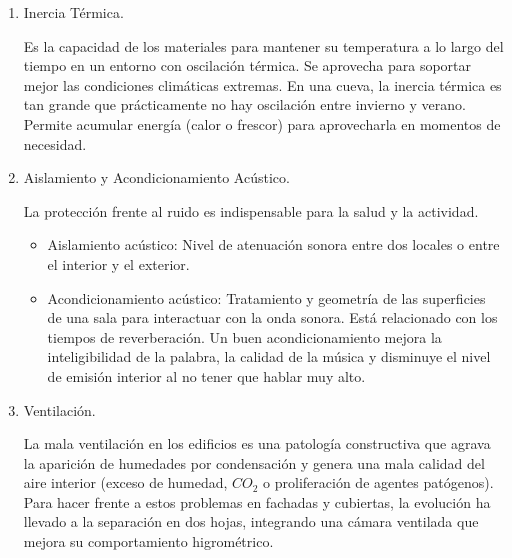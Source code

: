 \begin{enumerate}
Este mismo fenómeno se puede dar en la envolvente de los edificios el vapor de agua penetra a través de los cerramientos y tiende a ocupar el mayor volumen posible. Si el gradiente de temperatura alcanza el punto de rocío, se producirá la condensación.

La disposición de barrera de vapor supone un medio de evitar las condensaciones intersiciales situándolas siempre en la cara caliente del aislamiento térmico, evitando que el vapor penetre y se condense en el interior.

Los puentes térmicos son discontinuidades en el aislamiento (pérdidas de energía) susceptibles de generar condensaciones, conllevando al deterioro de los materiales.

    \item Inercia Térmica.
    
Es la capacidad de los materiales para mantener su temperatura a lo largo del tiempo en un entorno con oscilación térmica. Se aprovecha para soportar mejor las condiciones climáticas extremas. En una cueva, la inercia térmica es tan grande que prácticamente no hay oscilación entre invierno y verano. Permite acumular energía (calor o frescor) para aprovecharla en momentos de necesidad.

    \item Aislamiento y Acondicionamiento Acústico.
    
La protección frente al ruido es indispensable para la salud y la actividad.

\begin{itemize}
    \item Aislamiento acústico: Nivel de atenuación sonora entre dos locales o entre el interior y el exterior.
    \item Acondicionamiento acústico: Tratamiento y geometría de las superficies de una sala para interactuar con la onda sonora. Está relacionado con los tiempos de reverberación. Un buen acondicionamiento mejora la inteligibilidad de la palabra, la calidad de la música y disminuye el nivel de emisión interior al no tener que hablar muy alto.
\end{itemize}

    \item Ventilación.
    
La mala ventilación en los edificios es una patología constructiva que agrava la aparición de humedades por condensación y genera una mala calidad del aire interior (exceso de humedad, $CO_2$ o proliferación de agentes patógenos). Para hacer frente a estos problemas en fachadas y cubiertas, la evolución ha llevado a la separación en dos hojas, integrando una cámara ventilada que mejora su comportamiento higrométrico.


\end{enumerate}
